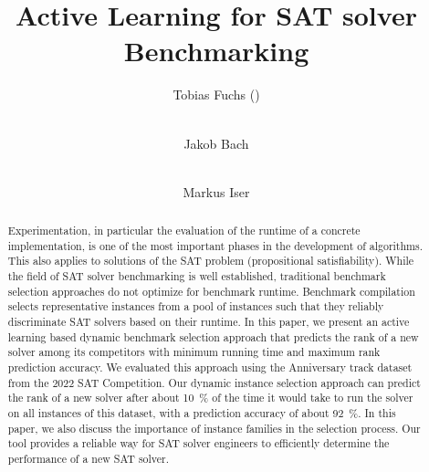 \documentclass[runningheads]{llncs}
\begin{document}
\title{Active Learning for SAT solver Benchmarking}

\author{
	Tobias Fuchs (\Letter) \and \\
	Jakob Bach \and \\
	Markus Iser
}



\maketitle

\begin{abstract}
  Experimentation, in particular the evaluation of the runtime of a concrete implementation, is one of the most important phases in the development of algorithms.
  This also applies to solutions of the SAT problem (propositional sat\-is\-fia\-bi\-li\-ty).
  While the field of SAT solver benchmarking is well established, traditional benchmark selection approaches do not optimize for benchmark runtime.
  Benchmark compilation selects representative instances from a pool of instances such that they reliably discriminate SAT solvers based on their runtime.
  In this paper, we present an active learning based dynamic benchmark selection approach that predicts the rank of a new solver among its competitors with minimum running time and maximum rank prediction accuracy.
  We evaluated this approach using the Anniversary track dataset from the 2022 SAT Competition. 
  Our dynamic instance selection approach can predict the rank of a new solver after about \SI{10}{\%} of the time it would take to run the solver on all instances of this dataset, with a prediction accuracy of about \SI{92}{\%}. 
  In this paper, we also discuss the importance of instance families in the selection process. 
  Our tool provides a reliable way for SAT solver engineers to efficiently determine the performance of a new SAT solver.

\end{abstract}
\end{document}
